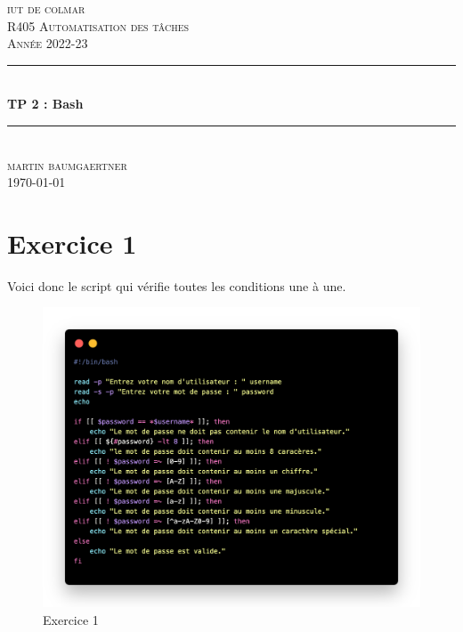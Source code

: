 \documentclass[12pt, a4paper]{article}
\begin{document}
\begin{titlepage}
	\newcommand{\HRule}{\rule{\linewidth}{0.5mm}} 
	\center 
	\textsc{\LARGE iut de colmar}\\[6.5cm] 
	\textsc{\Large R405 Automatisation des tâches}\\[0.5cm] 
	\textsc{\large Année 2022-23}\\[0.5cm]
	\HRule\\[0.75cm]
	{\huge\bfseries TP 2 : Bash}\\[0.4cm]
	\HRule\\[1.5cm]
	\textsc{\large martin baumgaertner}\\[6.5cm] 

	\vfill\vfill\vfill
	{\large\today} 
	\vfill
\end{titlepage}
\newpage
\tableofcontents
\newpage
\section{Exercice 1}
Voici donc le script qui vérifie toutes les conditions une à une. 
\begin{figure}[h]
    \centering
    \includegraphics[width=1\textwidth]{img/exo1.png}
    \caption{Exercice 1}
    \label{fig:script2}
\end{figure}

\newpage
\end{document}
